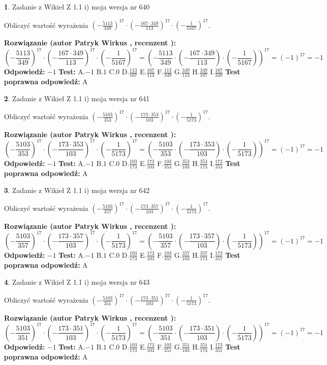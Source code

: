 \documentclass[12pt, a4paper]{article}
\theoremstyle{definition} %
\newtheorem{zad}{}
\newcommand{\zadStart}[1]{\begin{zad}#1\newline}
\newcommand{\zadStop}{\end{zad}}
\newcommand{\rozwStart}[2]{\noindent \textbf{Rozwiązanie (autor #1 , recenzent #2): }\newline}
\newcommand{\rozwStop}{\newline}
\newcommand{\odpStart}{\noindent \textbf{Odpowiedź:}\newline}
\newcommand{\odpStop}{\newline}
\newcommand{\testStart}{\noindent \textbf{Test:}\newline}
\newcommand{\testStop}{\newline}
\newcommand{\kluczStart}{\noindent \textbf{Test poprawna odpowiedź:}\newline}
\newcommand{\kluczStop}{\newline}
\begin{document}
\zadStart{Zadanie z Wikieł Z 1.1 i) moja wersja nr 640}

Obliczyć wartość wyrażenia $(-\frac{5113}{349})^{17} \cdot (-\frac{167 \cdot 349}{113})^{17} \cdot (-\frac{1}{5167})^{17}$.
\zadStop
\rozwStart{Patryk Wirkus}{}
$$(-\frac{5113}{349})^{17} \cdot (-\frac{167 \cdot 349}{113})^{17} \cdot (-\frac{1}{5167})^{17} = (-\frac{5113}{349} \cdot (-\frac{167 \cdot 349}{113}) \cdot (-\frac{1}{5167}))^{17} = (-1)^{17} = -1$$
\rozwStop
\odpStart
$-1$
\odpStop
\testStart
A.$-1$ B.$1$ C.$0$ D.$\frac{113}{167}$ E.$\frac{167}{113}$
F.$\frac{113}{349}$ G.$\frac{349}{113}$
H.$\frac{349}{167}$
I.$\frac{167}{349}$
\testStop
\kluczStart
A
\kluczStop



\zadStart{Zadanie z Wikieł Z 1.1 i) moja wersja nr 641}

Obliczyć wartość wyrażenia $(-\frac{5103}{353})^{17} \cdot (-\frac{173 \cdot 353}{103})^{17} \cdot (-\frac{1}{5173})^{17}$.
\zadStop
\rozwStart{Patryk Wirkus}{}
$$(-\frac{5103}{353})^{17} \cdot (-\frac{173 \cdot 353}{103})^{17} \cdot (-\frac{1}{5173})^{17} = (-\frac{5103}{353} \cdot (-\frac{173 \cdot 353}{103}) \cdot (-\frac{1}{5173}))^{17} = (-1)^{17} = -1$$
\rozwStop
\odpStart
$-1$
\odpStop
\testStart
A.$-1$ B.$1$ C.$0$ D.$\frac{103}{173}$ E.$\frac{173}{103}$
F.$\frac{103}{353}$ G.$\frac{353}{103}$
H.$\frac{353}{173}$
I.$\frac{173}{353}$
\testStop
\kluczStart
A
\kluczStop



\zadStart{Zadanie z Wikieł Z 1.1 i) moja wersja nr 642}

Obliczyć wartość wyrażenia $(-\frac{5103}{357})^{17} \cdot (-\frac{173 \cdot 357}{103})^{17} \cdot (-\frac{1}{5173})^{17}$.
\zadStop
\rozwStart{Patryk Wirkus}{}
$$(-\frac{5103}{357})^{17} \cdot (-\frac{173 \cdot 357}{103})^{17} \cdot (-\frac{1}{5173})^{17} = (-\frac{5103}{357} \cdot (-\frac{173 \cdot 357}{103}) \cdot (-\frac{1}{5173}))^{17} = (-1)^{17} = -1$$
\rozwStop
\odpStart
$-1$
\odpStop
\testStart
A.$-1$ B.$1$ C.$0$ D.$\frac{103}{173}$ E.$\frac{173}{103}$
F.$\frac{103}{357}$ G.$\frac{357}{103}$
H.$\frac{357}{173}$
I.$\frac{173}{357}$
\testStop
\kluczStart
A
\kluczStop



\zadStart{Zadanie z Wikieł Z 1.1 i) moja wersja nr 643}

Obliczyć wartość wyrażenia $(-\frac{5103}{351})^{17} \cdot (-\frac{173 \cdot 351}{103})^{17} \cdot (-\frac{1}{5173})^{17}$.
\zadStop
\rozwStart{Patryk Wirkus}{}
$$(-\frac{5103}{351})^{17} \cdot (-\frac{173 \cdot 351}{103})^{17} \cdot (-\frac{1}{5173})^{17} = (-\frac{5103}{351} \cdot (-\frac{173 \cdot 351}{103}) \cdot (-\frac{1}{5173}))^{17} = (-1)^{17} = -1$$
\rozwStop
\odpStart
$-1$
\odpStop
\testStart
A.$-1$ B.$1$ C.$0$ D.$\frac{103}{173}$ E.$\frac{173}{103}$
F.$\frac{103}{351}$ G.$\frac{351}{103}$
H.$\frac{351}{173}$
I.$\frac{173}{351}$
\testStop
\kluczStart
A
\kluczStop
\end{document}
